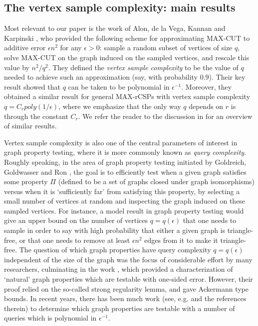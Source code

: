 \documentclass[final, 12pt]{colt2018}
\theoremstyle{definition}
\theoremstyle{plain}
\begin{document}
\subsection{The vertex sample complexity: main results}
Most relevant to our paper is the work of Alon, de la Vega, Kannan and Karpinski \citep{alon-etal-samplingCSP}, who provided the following scheme for approximating MAX-CUT to additive error $\epsilon n^2$ for any $\epsilon > 0$: sample a random subset of vertices of size $q$, solve MAX-CUT on the  graph induced on the sampled vertices, and rescale this value by $n^{2}/q^{2}$. They defined the \emph{vertex sample complexity} to be the value of $q$ needed to achieve such an approximation (say, with probability $0.9$). Their key result showed that $q$ can be taken to be polynomial in $\epsilon^{-1}$. Moreover, they obtained a similar result for general MAX-rCSPs with vertex sample complexity $q = C_r poly(1/\epsilon)$, where we emphasize that the only way $q$ depends on $r$ is through the constant $C_r$. We refer the reader to the discussion in \citep{Alon:06} for an overview of similar results. 

Vertex sample complexity is also one of the central parameters of interest in graph property testing, where it is more commonly known as \emph{query complexity}. Roughly speaking, in the area of graph property testing initiated by Goldreich, Goldwasser and Ron \citep{goldreich1998property}, the goal is to efficiently test when a given graph satisfies some property $\Pi$ (defined to be a set of graphs closed under graph isomorphisms) versus when it is `sufficiently far' from satisfying this property, by selecting a small number of vertices at random and inspecting the graph induced on these sampled vertices. For instance, a model result in graph property testing would give an upper bound on the number of vertices $q = q(\epsilon)$ that one needs to sample in order to say with high probability that either a given graph is triangle-free, or that one needs to remove at least $\epsilon n^2$ edges from it to make it triangle-free. The question of which graph properties have query complexity $q=q(\epsilon)$ independent of the size of the graph was the focus of considerable effort by many researchers, culminating in the work \citep{alon2008characterization}, which provided a characterization of `natural' graph properties which are testable with one-sided error. However, their proof relied on the so-called strong regularity lemma, and gave Ackermann type bounds. In recent years, there has been much work (see, e.g. \citet{gishboliner2016removal, gishboliner2017efficient} and the references therein) to determine which graph properties are testable with a number of queries which is polynomial in $\epsilon^{-1}$.     
\end{document}
